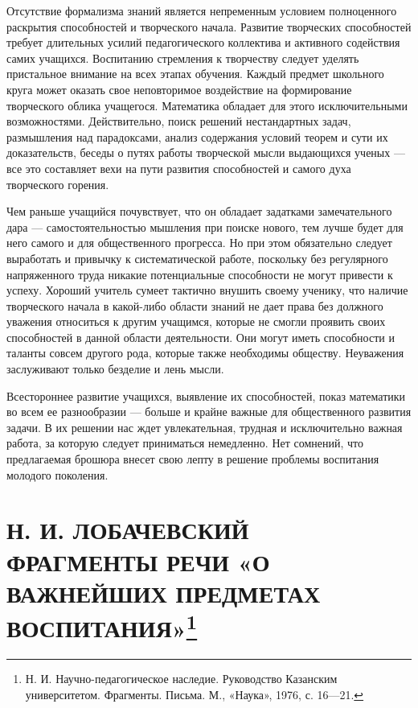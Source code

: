 \documentclass[12pt, a4paper, openany]{book}
\begin{document}
Отсутствие формализма знаний является непременным условием полноценного раскрытия способностей и  творческого начала. Развитие творческих способностей требует длительных усилий педагогического коллектива и  активного содействия самих учащихся. Воспитанию стремления к творчеству следует уделять пристальное внимание на всех этапах обучения. Каждый предмет школьного круга может оказать свое неповторимое воздействие на  формирование творческого облика учащегося. Математика  обладает для этого исключительными возможностями.  Действительно, поиск решений нестандартных задач,  размышления над парадоксами, анализ содержания условий теорем и сути их доказательств, беседы о путях работы  творческой мысли выдающихся ученых — все это составляет вехи на пути развития способностей и самого духа  творческого горения. 

Чем раньше учащийся почувствует, что он обладает  задатками замечательного дара — самостоятельностью мышления при поиске нового, тем лучше будет для него самого и для общественного прогресса. Но при этом  
обязательно следует выработать и привычку к  систематической работе, поскольку без регулярного напряженного труда никакие потенциальные способности не могут  привести к успеху. Хороший учитель сумеет тактично внушить своему ученику, что наличие творческого начала в какой-либо области знаний не дает права без должного уважения относиться к другим учащимся, которые не смогли проявить своих способностей в данной области деятельности. Они могут иметь способности и таланты совсем другого рода, которые также необходимы обществу. Неуважения  заслуживают только безделие и лень мысли. 

Всестороннее развитие учащихся, выявление их  способностей, показ математики во всем ее разнообразии — больше и крайне важные для общественного развития  задачи. В их решении нас ждет увлекательная, трудная и  исключительно важная работа, за которую следует  приниматься немедленно. Нет сомнений, что предлагаемая  брошюра внесет свою лепту в решение проблемы воспитания молодого поколения. 


\section[\textls{Н. И. Лобачевский}. Фрагменты речи «О важнейших предметах воспитания»]{{\small Н. И. ЛОБАЧЕВСКИЙ} \\ \textbf{ФРАГМЕНТЫ РЕЧИ «О ВАЖНЕЙШИХ ПРЕДМЕТАХ ВОСПИТАНИЯ»}{\footnote{ Н. И. Научно-педагогическое наследие. Руководство Казанским университетом. Фрагменты. Письма. М., «Наука», 1976, с. 16—21. }}}
\end{document}

